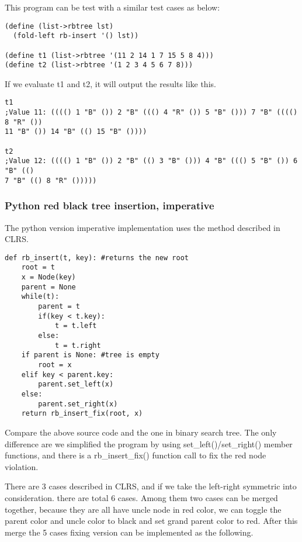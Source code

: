 \documentclass{article}
\begin{document}
This program can be test with a similar test cases as below:

\begin{lstlisting}
(define (list->rbtree lst)
  (fold-left rb-insert '() lst))

(define t1 (list->rbtree '(11 2 14 1 7 15 5 8 4)))
(define t2 (list->rbtree '(1 2 3 4 5 6 7 8)))
\end{lstlisting}

If we evaluate t1 and t2, it will output the results like this.

\begin{verbatim}
t1
;Value 11: (((() 1 "B" ()) 2 "B" ((() 4 "R" ()) 5 "B" ())) 7 "B" (((() 8 "R" ()) 
11 "B" ()) 14 "B" (() 15 "B" ())))

t2
;Value 12: (((() 1 "B" ()) 2 "B" (() 3 "B" ())) 4 "B" ((() 5 "B" ()) 6 "B" (() 
7 "B" (() 8 "R" ()))))
\end{verbatim}


\subsubsection*{Python red black tree insertion, imperative}

The python version imperative implementation uses the method described in CLRS.

\lstset{language=Python}
\begin{lstlisting}
def rb_insert(t, key): #returns the new root
    root = t
    x = Node(key)
    parent = None
    while(t):
        parent = t
        if(key < t.key):
            t = t.left
        else:
            t = t.right
    if parent is None: #tree is empty
        root = x
    elif key < parent.key:
        parent.set_left(x)
    else:
        parent.set_right(x)
    return rb_insert_fix(root, x)
\end{lstlisting}

Compare the above source code and the one in binary search tree\cite{bst-lxy}. The only difference are we simplified the program by using set\_left()/set\_right() member functions, and there is a rb\_insert\_fix() function call to fix the red node violation.

There are 3 cases described in CLRS, and if we take the left-right symmetric into consideration. there are total 6 cases. Among them two cases can be merged together, because they are all have uncle node in red color, we can toggle the parent color and uncle color to black and set grand parent color to red. After this merge the 5 cases fixing version can be implemented as the following.
\end{document}
